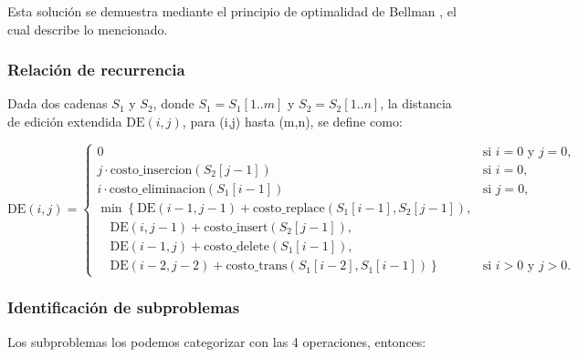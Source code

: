 Esta solución se demuestra mediante el principio de optimalidad de Bellman \cite{optimizaciondp}, el
cual describe lo mencionado.

\subsubsection{Relación de recurrencia}

Dada dos cadenas \( S_1 \) y \( S_2 \), 
donde \( S_1 = S_1[1..m] \) y \( S_2 = S_2[1..n] \),
la distancia de edición extendida 
\( \text{DE}(i, j) \), para (i,j) hasta (m,n), se define  como:

\[  
\text{DE}(i, j) = 
\begin{cases}
0 & \text{si } i = 0 \text{ y } j = 0, \\
j \cdot \text{costo\_insercion}(S_2[j-1]) & \text{si } i = 0, \\
i \cdot \text{costo\_eliminacion}(S_1[i-1]) & \text{si } j = 0, \\
\min\left\{
\text{DE}(i-1, j-1) + \text{costo\_replace}(S_1[i-1], S_2[j-1]), \right. \\
\quad \left. \text{DE}(i, j-1) + \text{costo\_insert}(S_2[j-1]), \right. \\
\quad \left. \text{DE}(i-1, j) + \text{costo\_delete}(S_1[i-1]), \right. \\
\quad \left. \text{DE}(i-2, j-2) + \text{costo\_trans}(S_1[i-2], S_1[i-1]) \right\} 
& \text{si } i > 0 \text{ y } j > 0.
\end{cases}
\]

\subsubsection{Identificación de subproblemas}

Los subproblemas los podemos categorizar con las 4 operaciones, entonces:

